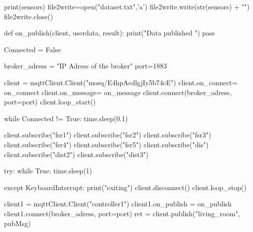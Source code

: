 \begin{python}
    print(sensors)
    file2write=open("dataset.txt",'a')
    file2write.write(str(sensors) + "\n")
    file2write.close()

def on_publish(client, userdata, result):
    print("Data published \n")
    pass

Connected = False

broker_adress = "IP Adress of the broker"
port=1883

client = mqttClient.Client("mosq/E4hpAcdlgjIy5b74cE")
client.on_connect= on_connect
client.on_message= on_message
client.connect(broker_adress, port=port)  
client.loop_start()

while Connected != True:    
    time.sleep(0.1)

client.subscribe("fsr1")
client.subscribe("fsr2")
client.subscribe("fsr3")
client.subscribe("fsr4")
client.subscribe("fsr5")
client.subscribe("dis")
client.subscribe("dist2")
client.subscribe("dist3")

try:
    while True:
        time.sleep(1)

except KeyboardInterrupt:
    print("exiting")
    client.disconnect()
    client.loop_stop()

client1 = mqttClient.Client("controller1")
client1.on_publish = on_publish
client1.connect(broker_adress, port=port)
ret = client.publish("living_room", pubMsg)
\end{python}

\newpage

\begin{python}

\end{python}

\newpage